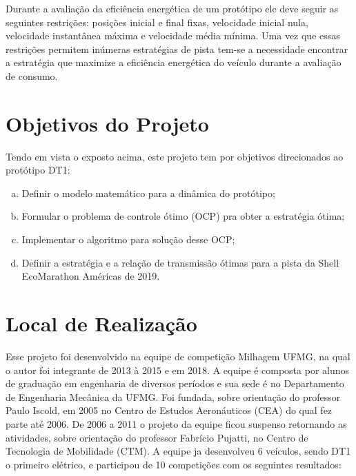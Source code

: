 Durante a avaliação da eficiência energética de um protótipo ele deve seguir as seguintes
restrições: posições inicial e final fixas, velocidade inicial nula, velocidade instantânea
máxima e velocidade média mínima. Uma vez que essas restrições permitem inúmeras
estratégias de pista tem-se a necessidade encontrar a estratégia que maximize a
eficiência energética do veículo durante a avaliação de consumo.


\section{Objetivos do Projeto}
\label{sec:objetivos}

Tendo em vista o exposto acima, este projeto tem por objetivos direcionados ao protótipo DT1:

\begin{enumerate}[(a)]
    \item Definir o modelo matemático para a dinâmica do protótipo;
    \item Formular o problema de controle ótimo (OCP) pra obter a estratégia ótima;
    \item Implementar o algoritmo para solução desse OCP;
    \item Definir a estratégia e a relação de transmissão ótimas para a pista da Shell EcoMarathon Américas de 2019.
\end{enumerate}

\section{Local de Realização}
\label{sec:empresa}


Esse projeto foi desenvolvido na equipe de competição Milhagem UFMG, na qual o autor foi integrante de 2013 à 2015 e em 2018. A equipe é composta por alunos de graduação em engenharia de diversos períodos e sua sede é no Departamento de Engenharia Mecânica da UFMG.
Foi fundada, sobre orientação do
professor Paulo Iscold, em 2005 no Centro de Estudos Aeronáuticos (CEA) do qual fez
parte até 2006.
De 2006 a 2011 o projeto da equipe ficou suspenso retornando as atividades, sobre orientação do professor Fabrício Pujatti, no Centro de Tecnologia
de Mobilidade (CTM). A equipe ja desenvolveu 6 veículos, sendo DT1 o primeiro elétrico, e participou de 10 competições com os seguintes resultados:


